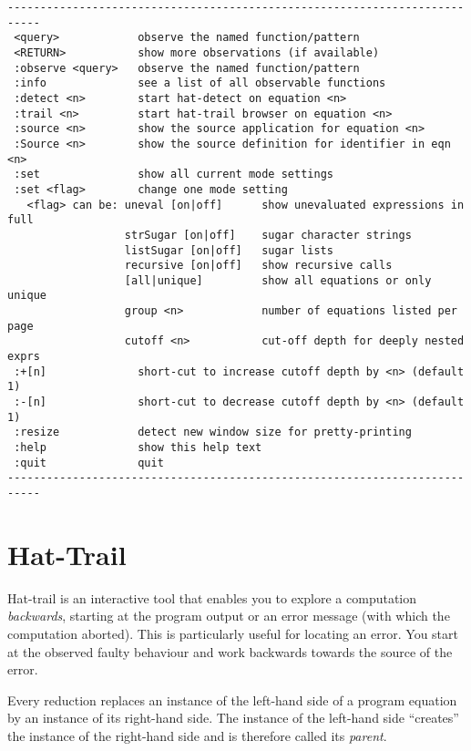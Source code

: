 \documentclass[12pt]{article}
\begin{document}
\begin{verbatim}
---------------------------------------------------------------------------
 <query>            observe the named function/pattern
 <RETURN>           show more observations (if available)
 :observe <query>   observe the named function/pattern
 :info              see a list of all observable functions
 :detect <n>        start hat-detect on equation <n>
 :trail <n>         start hat-trail browser on equation <n>
 :source <n>        show the source application for equation <n>
 :Source <n>        show the source definition for identifier in eqn <n>
 :set               show all current mode settings
 :set <flag>        change one mode setting
   <flag> can be: uneval [on|off]      show unevaluated expressions in full
                  strSugar [on|off]    sugar character strings
                  listSugar [on|off]   sugar lists
                  recursive [on|off]   show recursive calls
                  [all|unique]         show all equations or only unique
                  group <n>            number of equations listed per page
                  cutoff <n>           cut-off depth for deeply nested exprs
 :+[n]              short-cut to increase cutoff depth by <n> (default 1)
 :-[n]              short-cut to decrease cutoff depth by <n> (default 1)
 :resize            detect new window size for pretty-printing
 :help              show this help text
 :quit              quit
---------------------------------------------------------------------------
\end{verbatim}



\section{Hat-Trail}

Hat-trail is an interactive tool that enables you to explore a
computation \emph{backwards}, starting at the program output or
an error message (with which the computation aborted). This is
particularly useful for locating an error. You start at the observed
faulty behaviour and work backwards towards the source of the error.

Every reduction replaces an instance of the left-hand side of a program
equation by an instance of its right-hand side. The instance of the
left-hand side ``creates'' the instance of the right-hand side and
is therefore called its \emph{parent}.
\end{document}
